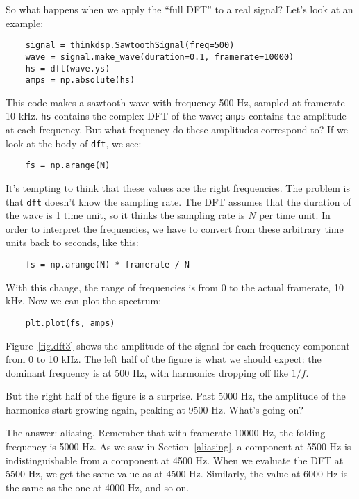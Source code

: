So what happens when we apply the ``full DFT'' to a real signal?
Let's look at an example:

\begin{verbatim}
	signal = thinkdsp.SawtoothSignal(freq=500)
	wave = signal.make_wave(duration=0.1, framerate=10000)
	hs = dft(wave.ys)
	amps = np.absolute(hs)
\end{verbatim}

This code makes a sawtooth wave with frequency 500 Hz, sampled at
framerate 10 kHz.  {\tt hs} contains the complex DFT of the wave;
{\tt amps} contains the amplitude at each frequency.  But what
frequency do these amplitudes correspond to?  If we look at the
body of {\tt dft}, we see:

\begin{verbatim}
	fs = np.arange(N)
\end{verbatim}

It's tempting to think that these values are the right frequencies.
The problem is that {\tt dft} doesn't know the sampling rate.  The DFT
assumes that the duration of the wave is 1 time unit, so it thinks the
sampling rate is $N$ per time unit.  In order to interpret the
frequencies, we have to convert from these arbitrary time units back
to seconds, like this:

\begin{verbatim}
	fs = np.arange(N) * framerate / N
\end{verbatim}

With this change, the range of frequencies is from 0 to the actual
framerate, 10 kHz.  Now we can plot the spectrum:

\begin{verbatim}
	plt.plot(fs, amps)
\end{verbatim}

Figure~\ref{fig.dft3} shows the amplitude of the signal for each
frequency component from 0 to 10 kHz.  The left half of the figure
is what we should expect: the dominant frequency is at 500 Hz, with
harmonics dropping off like $1/f$.

But the right half of the figure is a surprise.  Past 5000 Hz, the
amplitude of the harmonics start growing again, peaking at 9500 Hz.
What's going on?

The answer: aliasing.  Remember that with framerate 10000 Hz, the
folding frequency is 5000 Hz.  As we saw in Section~\ref{aliasing},
a component at 5500 Hz is indistinguishable from a component
at 4500 Hz.  When we evaluate the DFT at 5500 Hz, we get the same
value as at 4500 Hz.  Similarly, the value at 6000 Hz is the same
as the one at 4000 Hz, and so on.

